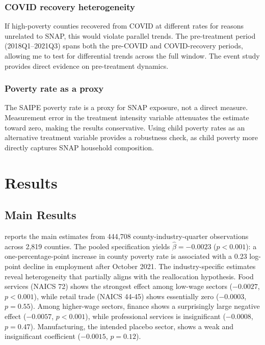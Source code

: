 \documentclass[12pt]{article}
\begin{document}
\subsubsection*{COVID recovery heterogeneity} If high-poverty counties recovered from COVID at different rates for reasons unrelated to SNAP, this would violate parallel trends. The pre-treatment period (2018Q1--2021Q3) spans both the pre-COVID and COVID-recovery periods, allowing me to test for differential trends across the full window. The event study provides direct evidence on pre-treatment dynamics.

\subsubsection*{Poverty rate as a proxy} The SAIPE poverty rate is a proxy for SNAP exposure, not a direct measure. Measurement error in the treatment intensity variable attenuates the estimate toward zero, making the results conservative. Using child poverty rates as an alternative treatment variable provides a robustness check, as child poverty more directly captures SNAP household composition.


\section{Results}

\subsection{Main Results}



 reports the main estimates from 444,708 county-industry-quarter observations across 2,819 counties. The pooled specification yields $\hat{\beta} = -0.0023$ ($p < 0.001$): a one-percentage-point increase in county poverty rate is associated with a 0.23 log-point decline in employment after October 2021. The industry-specific estimates reveal heterogeneity that partially aligns with the reallocation hypothesis. Food services (NAICS 72) shows the strongest effect among low-wage sectors ($-0.0027$, $p < 0.001$), while retail trade (NAICS 44-45) shows essentially zero ($-0.0003$, $p = 0.55$). Among higher-wage sectors, finance shows a surprisingly large negative effect ($-0.0057$, $p < 0.001$), while professional services is insignificant ($-0.0008$, $p = 0.47$). Manufacturing, the intended placebo sector, shows a weak and insignificant coefficient ($-0.0015$, $p = 0.12$).
\end{document}
